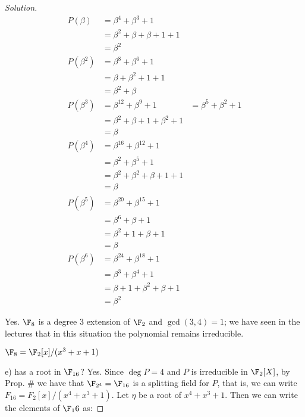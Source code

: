 \begin{proof}[Solution]
\begin{align*}
P(\beta)   &= \beta^4 + \beta^3 + 1\\
           &= \beta^2 + \beta + \beta + 1 + 1\\
           &= \beta^2\\
P(\beta^2) &= \beta^8 + \beta^6 + 1\\
           &= \beta + \beta^2 + 1 + 1\\
           &= \beta^2 + \beta\\
P(\beta^3) &= \beta^{12} + \beta^9 + 1
           &= \beta^5 + \beta^2 + 1\\
           &= \beta^2 + \beta + 1 + \beta^2 + 1\\
           &= \beta\\
P(\beta^4) &= \beta^{16} + \beta^{12} + 1\\
           &= \beta^2 + \beta^5 + 1\\
           &= \beta^2 + \beta^2 + \beta + 1 + 1\\
           &= \beta\\
P(\beta^5) &= \beta^{20} + \beta^{15} + 1\\
           &= \beta^6 + \beta + 1\\
           &= \beta^2 + 1 + \beta + 1\\
           &= \beta\\
P(\beta^6) &= \beta^{24} + \beta^{18} + 1\\
           &= \beta^3 + \beta^4 + 1\\
           &= \beta + 1 + \beta^2 + \beta + 1\\
           &= \beta^2
\end{align*}

{\color{blue}Yes. $\F_8$ is a degree $3$ extension of $\F_2$ and $\gcd(3, 4) = 1$; we have seen in the lectures that in this situation the polynomial remains irreducible.}

$\F_8 = \F_2[x] / (x^3 + x + 1)$

e) has a root in $\F_{16}$?
Yes. Since $\deg{P} = 4$ and $P$ is irreducible in $\F_2[X]$, by Prop. \# we have that $\F_{2^4} = \F_{16}$ is a splitting field for $P$, that is, we can write $F_{16} = F_2[x] / (x^4 + x^3 + 1)$. Let $\eta$ be a root of $x^4 + x^3 + 1$. Then we can write the elements of $\F_16$ as:


\end{proof}
